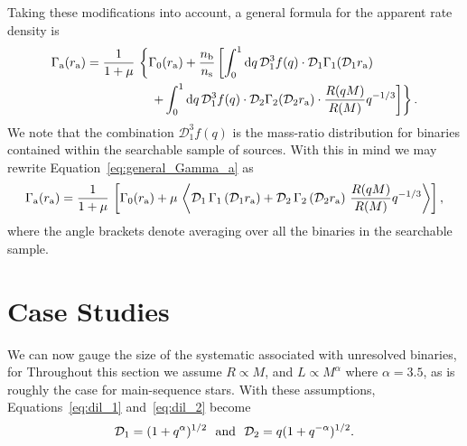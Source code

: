 \documentclass[12pt,modern,trackchanges]{aastex61}
\renewcommand{\a}{_{\rm a}}
\newcommand{\s}{_{\rm s}}
\renewcommand{\b}{_{\rm b}}
\begin{document}
Taking these modifications into account, a general formula for the
apparent rate density is
\begin{align}
    \notag
    \Gamma\a(r\a) &= \frac{1}{1+\mu} \,
    \left\{ \Gamma_0(r\a)+ 
    \frac{n\b}{n\s}
    \left[ \int_0^1 \mathrm{d}q \,
           \mathcal{D}_1^3 f(q)\cdot
           \mathcal{D}_1 \Gamma_1(\mathcal{D}_1r\a)\,
    \right.   
    \right. \\
    & \quad\quad\quad\quad\quad \left.\left.
    +\int_0^1 {\rm d}q\, 
         \mathcal{D}_1^3 f(q)\cdot \mathcal{D}_2
         \Gamma_2(\mathcal{D}_2r\a)\cdot
         \frac{R(qM)}{R(M)} q^{-1/3}
    \right] \right\}.
    \label{eq:general_Gamma_a}
\end{align}
We note that the combination $\mathcal{D}_1^3f(q)$ is the mass-ratio
distribution for binaries contained within the searchable sample of
sources.  With this in mind we may rewrite
Equation~\ref{eq:general_Gamma_a} as
\begin{align}
    \Gamma\a(r\a)
    =
    {1\over 1+\mu} \,
    \left[
       \Gamma_0(r\a)
       +\mu\,
       \left\langle
       \mathcal{D}_1 \, \Gamma_1\left(\mathcal{D}_1r\a\right)
       +
       {\mathcal{D}_2} \, \Gamma_2\left(\mathcal{D}_2r\a\right)
       \,
       {R(qM) \over R(M)}q^{-1/3}
       \right\rangle
    \right],
\end{align}
where the angle brackets denote averaging over all the binaries in the
searchable sample.



\section{Case Studies}
\label{sec:more_complicated}



We can now gauge the size of the systematic 
 associated
with unresolved binaries, for 
Throughout this
section we assume $R\propto M$, and $L \propto M^{\alpha}$ where
$\alpha = 3.5$, as is roughly the case for main-sequence stars.
With these assumptions, Equations~\ref{eq:dil_1} and~\ref{eq:dil_2}
become
\begin{equation}
  \mathcal{D}_1
  =  (1+q^\alpha)^{1/2}~~{\rm and}~~\mathcal{D}_2
  = q(1+q^{-\alpha})^{1/2}.
\end{equation}
\end{document}
